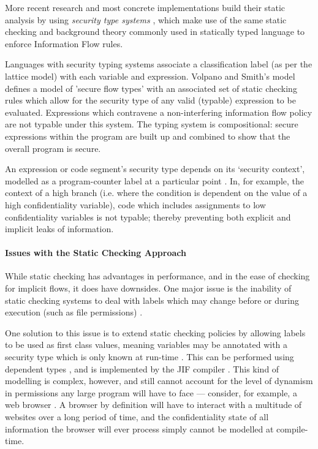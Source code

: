 	More recent research and most concrete implementations build their static analysis by using \textit{security type systems} \cite{sabelfeld2003if}, which make use of the same static checking and background theory commonly used in statically typed language to enforce Information Flow rules.
	
	Languages with security typing systems associate a classification label (as per the lattice model) with each variable and expression. Volpano and Smith's model \cite{volpano1996sectype} defines a model of 'secure flow types' with an associated set of static checking rules which allow for the security type of any valid (typable) expression to be evaluated. Expressions which contravene a non-interfering information flow policy are not typable under this system. The typing system is compositional: secure expressions within the program are built up and combined to show that the overall program is secure.
	
	An expression or code segment's security type depends on its `security context', modelled as a program-counter label at a particular point \cite{sabelfeld2003if}. In, for example, the context of a high branch (i.e. where the condition is dependent on the value of a high confidentiality variable), code which includes assignments to low confidentiality variables is not typable; thereby preventing both explicit and implicit leaks of information.
	
	\paragraph{Issues with the Static Checking Approach}
	
	While static checking has advantages in performance, and in the ease of checking for implicit flows, it does have downsides. One major issue is the inability of static checking systems to deal with labels which may change before or during execution (such as file permissions) \cite{sabelfeld2003if}.
	
	One solution to this issue is to extend static checking policies by allowing labels to be used as first class values, meaning variables may be annotated with a security type which is only known at run-time \cite{myers1997if}. This can be performed using dependent types \cite{xi1999dependenttypes}, and is implemented by the JIF compiler \cite{myers1999jif}. This kind of modelling is complex, however, and still cannot account for the level of dynamism in permissions any large program will have to face --- consider, for example, a web browser \cite{venkatakrishnan2006runtime}. A browser by definition will have to interact with a multitude of websites over a long period of time, and the confidentiality state of all information the browser will ever process simply cannot be modelled at compile-time.
	
